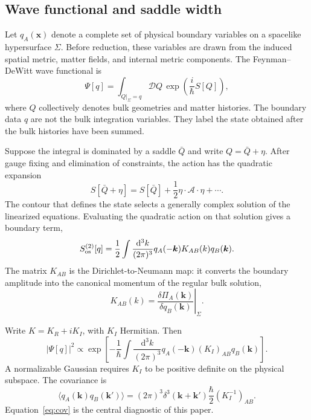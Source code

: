 \documentclass[aps,prd,twocolumn,superscriptaddress,nofootinbib,longbibliography,floatfix]{revtex4-2}
\newcommand{\dd}{\mathrm d}
\begin{document}
\subsection{Wave functional and saddle width}
Let $q_A(\bm x)$ denote a complete set of physical boundary variables on a spacelike hypersurface $\Sigma$. Before reduction, these variables are drawn from the induced spatial metric, matter fields, and internal metric components. The Feynman--DeWitt wave functional is
\begin{equation}
\Psi[q]=\int_{Q|_\Sigma=q}\mathcal DQ\,
\exp\left(\frac{i}{\hbar}S[Q]\right),
\end{equation}
where $Q$ collectively denotes bulk geometries and matter histories. The boundary data $q$ are not the bulk integration variables. They label the state obtained after the bulk histories have been summed.

Suppose the integral is dominated by a saddle $\bar Q$ and write $Q=\bar Q+\eta$. After gauge fixing and elimination of constraints, the action has the quadratic expansion
\begin{equation}
S[\bar Q+\eta]=S[\bar Q]+\frac12\eta\cdot\mathcal A\cdot\eta+\cdots .
\end{equation}
The contour that defines the state selects a generally complex solution of the linearized equations. Evaluating the quadratic action on that solution gives a boundary term,
\begin{equation}
S_{\rm os}^{(2)}[q]=\frac12\int\frac{\dd^3k}{(2\pi)^3}
q_A(-\bm k)K_{AB}(k)q_B(\bm k).
\label{eq:onshell}
\end{equation}
The matrix $K_{AB}$ is the Dirichlet-to-Neumann map: it converts the boundary amplitude into the canonical momentum of the regular bulk solution,
\begin{equation}
K_{AB}(k)=\left.\frac{\delta\Pi_A(\bm k)}{\delta q_B(\bm k)}\right|_\Sigma.
\end{equation}

Write $K=K_R+iK_I$, with $K_I$ Hermitian. Then
\begin{equation}
|\Psi[q]|^2\propto
\exp\left[-\frac1\hbar\int\frac{\dd^3k}{(2\pi)^3}
q_A(-\bm k)(K_I)_{AB}q_B(\bm k)\right].
\end{equation}
A normalizable Gaussian requires $K_I$ to be positive definite on the physical subspace. The covariance is
\begin{equation}
\langle q_A(\bm k)q_B(\bm k')\rangle
=(2\pi)^3\delta^3(\bm k+\bm k')\frac\hbar2(K_I^{-1})_{AB}.
\label{eq:cov}
\end{equation}
Equation~\eqref{eq:cov} is the central diagnostic of this paper.
\end{document}
